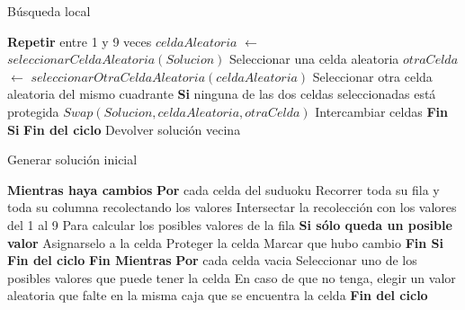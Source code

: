 \begin{algorithm}
\caption{B\'usqueda local}\label{BusquedaLocal}
\begin{algorithmic}[1]
\State \textbf{Repetir} entre 1 y 9 veces
\State\indent $celdaAleatoria$ $\gets$ $seleccionarCeldaAleatoria(Solucion)$
\Comment Seleccionar una celda aleatoria
\State\indent $otraCelda$ $\gets$ $seleccionarOtraCeldaAleatoria(celdaAleatoria)$
\Comment Seleccionar otra celda aleatoria del mismo cuadrante
\State\indent \textbf{Si} ninguna de las dos celdas seleccionadas est\'a protegida
\State\indent\indent $Swap(Solucion, celdaAleatoria, otraCelda)$ 
\Comment Intercambiar celdas
\State\indent \textbf{Fin Si}
\State \textbf{Fin del ciclo}
\State Devolver soluci\'on vecina

\EndFunction
\end{algorithmic}
\end{algorithm}

\begin{algorithm}
\caption{Generar soluci\'on inicial}\label{GenerarSolucionInicial}
\begin{algorithmic}[1]
\State \textbf{Mientras haya cambios}
\State\indent \textbf{Por} cada celda del suduoku
\State\indent\indent Recorrer toda su fila y toda su columna recolectando los valores
\State\indent\indent Intersectar la recolecci\'on con los valores del 1 al 9
\Comment Para calcular los posibles valores de la fila
\State\indent\indent \textbf{Si s\'olo queda un posible valor}
\State\indent\indent \indent Asignarselo a la celda
\State\indent\indent \indent Proteger la celda
\State\indent\indent \indent Marcar que hubo cambio
\State\indent\indent \textbf{Fin Si}
\State\indent \textbf{Fin del ciclo} 
\State \textbf{Fin Mientras}
\State \textbf{Por} cada celda vacia
\State\indent Seleccionar uno de los posibles valores que puede tener la celda 
\State\indent En caso de que no tenga, elegir un valor aleatoria que falte en la misma caja que se encuentra la celda
\State \textbf{Fin del ciclo}
\EndFunction
\end{algorithmic}
\end{algorithm}

